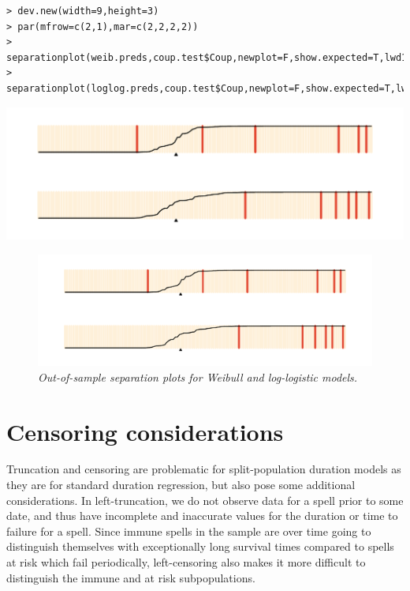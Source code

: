 \documentclass[]{article}
\begin{document}
\begin{verbatim}
> dev.new(width=9,height=3)
> par(mfrow=c(2,1),mar=c(2,2,2,2))
> separationplot(weib.preds,coup.test$Coup,newplot=F,show.expected=T,lwd1=5,lwd2=2)
> separationplot(loglog.preds,coup.test$Coup,newplot=F,show.expected=T,lwd1=5,lwd2=2)
\end{verbatim}

\includegraphics{out-of-sample.pdf}

\normalsize

\begin{figure}[htbp!]
\centering
\includegraphics[width=5in]{out-of-sample.pdf}
\caption{{\em Out-of-sample separation plots for Weibull and log-logistic models. }} \label{outsamp}
\end{figure}

\section{Censoring considerations}

Truncation and censoring are problematic for split-population duration
models as they are for standard duration regression, but also pose some
additional considerations. In left-truncation, we do not observe data
for a spell prior to some date, and thus have incomplete and inaccurate
values for the duration or time to failure for a spell. Since immune
spells in the sample are over time going to distinguish themselves with
exceptionally long survival times compared to spells at risk which fail
periodically, left-censoring also makes it more difficult to distinguish
the immune and at risk subpopulations.
\end{document}
